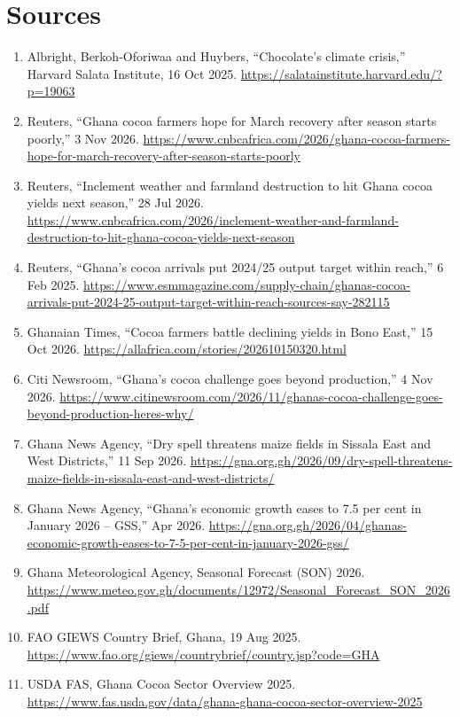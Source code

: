 \documentclass[11pt,letterpaper]{article}
\begin{document}
\section*{Sources}
\footnotesize
\begin{enumerate}[itemsep=0pt,topsep=2pt,leftmargin=1.4em]
\item Albright, Berkoh-Oforiwaa and Huybers, ``Chocolate's climate crisis,'' Harvard Salata Institute, 16 Oct 2025. \url{https://salatainstitute.harvard.edu/?p=19063}
\item Reuters, ``Ghana cocoa farmers hope for March recovery after season starts poorly,'' 3 Nov 2026. \url{https://www.cnbcafrica.com/2026/ghana-cocoa-farmers-hope-for-march-recovery-after-season-starts-poorly}
\item Reuters, ``Inclement weather and farmland destruction to hit Ghana cocoa yields next season,'' 28 Jul 2026. \url{https://www.cnbcafrica.com/2026/inclement-weather-and-farmland-destruction-to-hit-ghana-cocoa-yields-next-season}
\item Reuters, ``Ghana's cocoa arrivals put 2024/25 output target within reach,'' 6 Feb 2025. \url{https://www.esmmagazine.com/supply-chain/ghanas-cocoa-arrivals-put-2024-25-output-target-within-reach-sources-say-282115}
\item Ghanaian Times, ``Cocoa farmers battle declining yields in Bono East,'' 15 Oct 2026. \url{https://allafrica.com/stories/202610150320.html}
\item Citi Newsroom, ``Ghana's cocoa challenge goes beyond production,'' 4 Nov 2026. \url{https://www.citinewsroom.com/2026/11/ghanas-cocoa-challenge-goes-beyond-production-heres-why/}
\item Ghana News Agency, ``Dry spell threatens maize fields in Sissala East and West Districts,'' 11 Sep 2026. \url{https://gna.org.gh/2026/09/dry-spell-threatens-maize-fields-in-sissala-east-and-west-districts/}
\item Ghana News Agency, ``Ghana's economic growth eases to 7.5 per cent in January 2026 -- GSS,'' Apr 2026. \url{https://gna.org.gh/2026/04/ghanas-economic-growth-eases-to-7-5-per-cent-in-january-2026-gss/}
\item Ghana Meteorological Agency, Seasonal Forecast (SON) 2026. \url{https://www.meteo.gov.gh/documents/12972/Seasonal_Forecast_SON_2026.pdf}
\item FAO GIEWS Country Brief, Ghana, 19 Aug 2025. \url{https://www.fao.org/giews/countrybrief/country.jsp?code=GHA}
\item USDA FAS, Ghana Cocoa Sector Overview 2025. \url{https://www.fas.usda.gov/data/ghana-ghana-cocoa-sector-overview-2025}

\end{enumerate}
\end{document}
